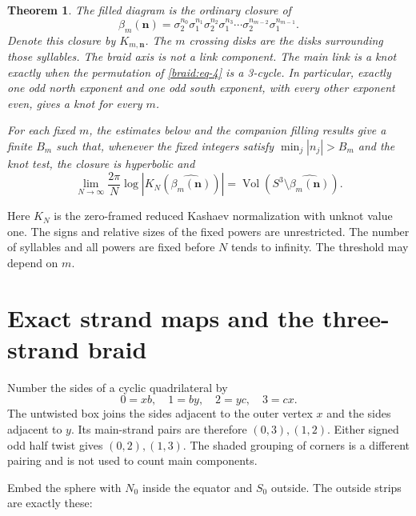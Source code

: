 \documentclass[11pt]{article}
\numberwithin{equation}{section}
\newtheorem{theorem}{Theorem}
\begin{document}
\begin{theorem}\label{thm:braids} The filled diagram is the ordinary closure of \begin{equation}\label{braid:eq-4}
\beta_m(\mathbf n)=
 \sigma_2^{n_0}\sigma_1^{n_1}\sigma_2^{n_2}\sigma_1^{n_3}
       \cdots\sigma_2^{n_{m-2}}\sigma_1^{n_{m-1}}.
\end{equation} Denote this closure by \(K_{m,\mathbf n}\). The \(m\)
crossing disks are the disks surrounding those syllables.
The braid axis is not a link component. The main link is a knot exactly
when the permutation of \eqref{braid:eq-4} is a 3-cycle. In particular, exactly one odd
north exponent and one odd south exponent, with every other exponent
even, gives a knot for every \(m\).

For each fixed \(m\), the estimates below and the companion filling
results give a finite \(B_m\) such that, whenever the fixed integers
satisfy \(\min_j|n_j|>B_m\) and the knot test, the closure is hyperbolic
and \begin{equation}\label{braid:eq-5}
\lim_{N\to\infty}\frac{2\pi}{N}
       \log|K_N(\widehat{\beta_m(\mathbf n)})|
  =\operatorname{Vol}(S^3\setminus\widehat{\beta_m(\mathbf n)}).
\end{equation}
\end{theorem}

Here \(K_N\) is the zero-framed reduced Kashaev normalization with
unknot value one. The signs and relative sizes of the fixed powers are
unrestricted. The number of syllables and all powers are fixed before $N$ tends to infinity. The threshold may depend on $m$.

\section{Exact strand maps and the three-strand
braid}\label{braid:sec-2}

Number the sides of a cyclic quadrilateral by \begin{equation}\label{braid:eq-6}
0=xb,\quad1=by,\quad2=yc,\quad3=cx.
\end{equation} The untwisted box joins the sides adjacent to the outer vertex $x$
and the sides adjacent to $y$. Its main-strand pairs are therefore
$(0,3),(1,2)$. Either signed odd half twist gives
\((0,2),(1,3)\). The shaded grouping of corners is a different pairing
and is not used to count main components.

Embed the sphere with \(N_0\) inside the equator and \(S_0\) outside.
The outside strips are exactly these:
\end{document}
